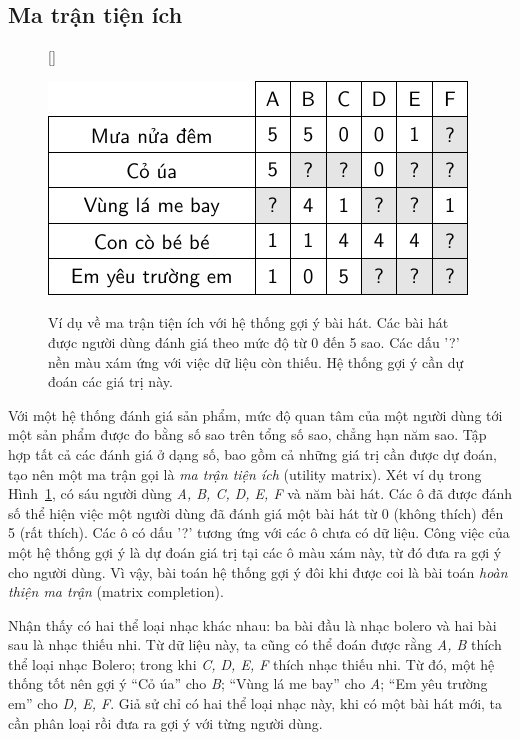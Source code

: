 \subsection{Ma trận tiện ích}

\begin{figure}[t]
    [\FBwidth]
    {\caption{ 
    Ví dụ về ma trận tiện ích với hệ thống gợi ý bài hát. Các bài hát được người dùng đánh giá theo mức độ từ 0
    đến 5 sao. Các dấu '?' nền màu xám ứng với việc dữ liệu còn thiếu. Hệ thống gợi ý cần dự đoán các giá trị này.
    }
    \label{fig:23_1}}
    { %
    \includegraphics[width=.5\textwidth]{Chapters/06_RecommendationSystems/23_contentbasedrecommendersys/latex/utility1.pdf}
    }
\end{figure}
 
Với một hệ thống đánh giá sản phẩm, {mức độ quan tâm} của một người dùng
tới một sản phẩm được đo bằng số sao trên tổng số sao, chẳng hạn năm sao. Tập hợp tất cả các đánh giá ở dạng số, bao gồm cả những giá trị cần được dự đoán, tạo nên
một ma trận gọi là \textit{ma trận tiện ích} (utility matrix). Xét ví dụ trong
Hình~\ref{fig:23_1}, có sáu người dùng \textit{A, B, C, D, E, F} và
năm bài hát. Các ô đã được đánh số thể hiện việc một người dùng đã đánh giá
một bài hát từ 0 (không thích) đến 5 (rất thích). Các ô có
dấu '?' tương ứng với các ô chưa có dữ liệu. Công việc của một
hệ thống gợi ý là dự đoán giá trị tại các ô màu xám này, từ đó đưa ra gợi
ý cho người dùng. Vì vậy, bài toán hệ thống gợi ý đôi khi được coi là
bài toán \textit{hoàn thiện ma trận} ({matrix completion}).
 
Nhận thấy có hai thể loại nhạc khác nhau: ba bài
đầu là nhạc {bolero} và hai bài sau là nhạc {thiếu nhi}. Từ dữ
liệu này, ta cũng có thể đoán được rằng \textit{A, B} thích thể loại nhạc
{Bolero}; trong khi \textit{C, D, E, F} thích nhạc {thiếu
nhi}. Từ đó, một hệ thống tốt nên gợi ý ``{Cỏ úa}'' cho \textit{B};
``{Vùng lá me bay}'' cho \textit{A}; ``{Em yêu trường em}'' cho \textit{D,
E, F}. Giả sử chỉ có hai thể loại nhạc này, khi có một bài hát mới, ta cần
phân loại rồi đưa ra gợi ý với từng người dùng.
 
